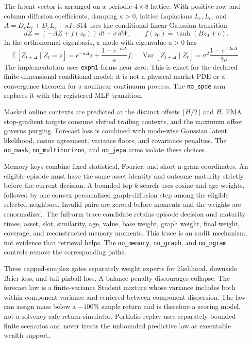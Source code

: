 \documentclass[11pt,a4paper]{article}
\begin{document}
The latent vector is arranged on a periodic $4\times8$ lattice. With positive
row and column diffusion coefficients, damping $\kappa>0$, lattice Laplacians
$L_r,L_c$, and $A=D_rL_r+D_cL_c+\kappa I$, S14 uses the conditional linear
Gaussian transition
\begin{equation}
 dZ=(-AZ+f(z_0))\,dt+\sigma\,dW,
 \qquad f(z_0)=\tanh(Bz_0+c).
\end{equation}
In the orthonormal eigenbasis, a mode with eigenvalue $a>0$ has
\begin{equation}
 \mathbb E[Z_{t+\Delta}\mid Z_t=z]
 =e^{-a\Delta}z+\frac{1-e^{-a\Delta}}{a}f,
 \quad
 \operatorname{Var}[Z_{t+\Delta}\mid Z_t]
 =\sigma^2\frac{1-e^{-2a\Delta}}{2a}.
\end{equation}
The implementation uses \texttt{expm1} forms near zero. This is exact for the
declared finite-dimensional conditional model; it is not a physical market PDE
or a convergence theorem for a nonlinear continuum process. The
\texttt{no\_spde} arm replaces it with the registered MLP transition.

Masked online contexts are predicted at the distinct offsets
$\lfloor H/2\rfloor$ and $H$. EMA stop-gradient targets consume shifted trailing
contexts, and the maximum offset governs purging. Forecast loss is combined
with mode-wise Gaussian latent likelihood, cosine agreement, variance floors,
and covariance penalties. The \texttt{no\_mask},
\texttt{no\_multihorizon}, and \texttt{no\_jepa} arms isolate these choices.

Memory keys combine fixed statistical, Fourier, and short n-gram coordinates.
An eligible episode must have the same asset identity and outcome maturity
strictly before the current decision. A bounded top-$k$ search uses cosine and
age weights, followed by one convex personalized graph-diffusion step among the
eligible selected neighbors. Invalid pairs are zeroed before moments and the
weights are renormalized. The full-arm trace candidate retains episode decision
and maturity times, asset, slot, similarity, age, value, base weight, graph
weight, final weight, coverage, and reconstructed memory moments. This trace is
an audit mechanism, not evidence that retrieval helps. The
\texttt{no\_memory}, \texttt{no\_graph}, and \texttt{no\_ngram} controls remove
the corresponding paths.

Three capped-simplex gates separately weight experts for likelihood, downside
Brier loss, and tail pinball loss. A balance penalty discourages collapse. The
forecast law is a finite-variance Student mixture whose variance includes both
within-component variance and centered between-component dispersion. The law
can assign mass below a $-100\%$ simple return and is therefore a scoring model,
not a solvency-safe return simulator. Portfolio replay uses separately bounded
finite scenarios and never treats the unbounded predictive law as executable
wealth support.
\end{document}
